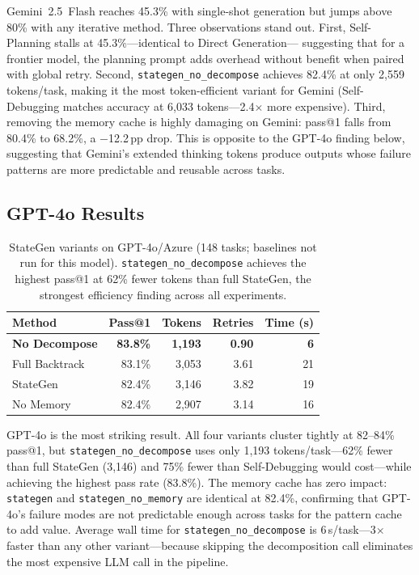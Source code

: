 \documentclass[11pt,twocolumn]{article}
\begin{document}
Gemini~2.5~Flash reaches 45.3\% with single-shot generation but jumps above
80\% with any iterative method. Three observations stand out.
First, Self-Planning stalls at 45.3\%---identical to Direct Generation---
suggesting that for a frontier model, the planning prompt adds overhead without
benefit when paired with global retry.
Second, \texttt{stategen\_no\_decompose} achieves 82.4\% at only 2,559
tokens/task, making it the most token-efficient variant for Gemini
(Self-Debugging matches accuracy at 6,033 tokens---2.4$\times$ more expensive).
Third, removing the memory cache is highly damaging on Gemini: pass@1 falls
from 80.4\% to 68.2\%, a $-$12.2\,pp drop. This is opposite to the GPT-4o
finding below, suggesting that Gemini's extended thinking tokens produce
outputs whose failure patterns are more predictable and reusable across tasks.

\subsection{GPT-4o Results}

\begin{table}[H]
\centering
\caption{StateGen variants on GPT-4o/Azure (148 tasks; baselines not run for
this model). \texttt{stategen\_no\_decompose} achieves the highest pass@1 at
62\% fewer tokens than full StateGen, the strongest efficiency finding across
all experiments.}
\label{tab:gpt4o}
\setlength{\tabcolsep}{4pt}
\begin{tabular}{lrrrr}
\toprule
\textbf{Method} & \textbf{Pass@1} & \textbf{Tokens} & \textbf{Retries} & \textbf{Time (s)} \\
\midrule
\textbf{No Decompose}   & \textbf{83.8\%} & \textbf{1,193} & \textbf{0.90} & \textbf{6}  \\
Full Backtrack          & 83.1\%          & 3,053          & 3.61          & 21  \\
StateGen                & 82.4\%          & 3,146          & 3.82          & 19  \\
No Memory               & 82.4\%          & 2,907          & 3.14          & 16  \\
\bottomrule
\end{tabular}
\end{table}

GPT-4o is the most striking result. All four variants cluster tightly at
82--84\% pass@1, but \texttt{stategen\_no\_decompose} uses only 1,193
tokens/task---62\% fewer than full StateGen (3,146) and 75\% fewer than
Self-Debugging would cost---while achieving the highest pass rate (83.8\%).
The memory cache has zero impact: \texttt{stategen} and
\texttt{stategen\_no\_memory} are identical at 82.4\%, confirming that
GPT-4o's failure modes are not predictable enough across tasks for the
pattern cache to add value.
Average wall time for \texttt{stategen\_no\_decompose} is 6\,s/task---3$\times$
faster than any other variant---because skipping the decomposition call
eliminates the most expensive LLM call in the pipeline.
\end{document}

